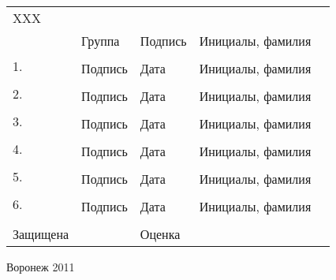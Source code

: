 \begin{tabular}{p{12em}p{5em}@{}p{5em}@{}r@{}r}
XXX & \hrulefill{}  & \hrulefill{}  & \hrulefill{}  \\
 &  \small{Группа}  & \small{Подпись} &\small{Инициалы, фамилия} \\

\multirow{2}{12em}{1. \newline{}} & \hrulefill{} & \hrulefill{} & \hrulefill{}  \\
 & \small{Подпись}  & \small{Дата} & \small{Инициалы, фамилия} \\

\multirow{2}{12em}{2. \newline{}} & \hrulefill{} & \hrulefill{} & \hrulefill{}  \\
 & \small{Подпись}  & \small{Дата} & \small{Инициалы, фамилия} \\

\multirow{2}{12em}{3. \newline{}} & \hrulefill{} & \hrulefill{} & \hrulefill{}  \\
 & \small{Подпись}  & \small{Дата} & \small{Инициалы, фамилия} \\

\multirow{2}{12em}{4. \newline{}} & \hrulefill{} & \hrulefill{} & \hrulefill{}  \\
 & \small{Подпись}  & \small{Дата} & \small{Инициалы, фамилия} \\

\multirow{2}{12em}{5. \newline{}} & \hrulefill{} & \hrulefill{} & \hrulefill{}  \\
 & \small{Подпись}  & \small{Дата} & \small{Инициалы, фамилия} \\

\multirow{2}{12em}{6. \newline{}} & \hrulefill{} & \hrulefill{} & \hrulefill{}  \\
 & \small{Подпись}  & \small{Дата} & \small{Инициалы, фамилия} \\

& & & \\
Защищена \hrulefill{} &  & Оценка \hrulefill{} & \hrulefill{} 
\end{tabular}

\vspace{1.5em}

\begin{center}Воронеж 2011\end{center}
